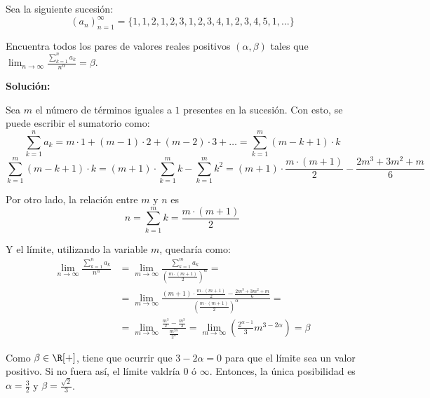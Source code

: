 \documentclass[../../main.tex]{subfiles}
\begin{document}
  \begin{shaded}
    Sea la siguiente sucesión:
    $$
    (a_n)_{n = 1}^\infty = \{1, 1, 2, 1, 2, 3, 1, 2, 3, 4, 1, 2, 3, 4, 5, 1, ...\}
    $$

    Encuentra todos los pares de valores reales positivos $(\alpha, \beta)$ tales que $ \displaystyle\lim_{n \to \infty} \displaystyle\frac{\displaystyle\sum_{k = 1}^n a_k}{n^\alpha} = \beta$.
  \end{shaded}

  \textbf{Solución:}

  Sea $m$ el número de términos iguales a $1$ presentes en la sucesión. Con esto, se puede escribir el sumatorio como:
  $$
  \sum_{k = 1}^n a_k = 
  m \cdot 1 + (m - 1) \cdot 2 + (m - 2) \cdot 3 + \dots = 
  \sum_{k = 1}^m (m - k + 1) \cdot k
  $$
  $$
  \sum_{k = 1}^m (m - k + 1) \cdot k = 
  (m + 1) \cdot \sum_{k = 1}^m k - \sum_{k = 1}^m k^2 = 
  (m + 1) \cdot \frac{m \cdot (m + 1)}{2} - \frac{2m^3 + 3m^2 + m}{6}
  $$

  Por otro lado, la relación entre $m$ y $n$ es
  $$
  n = \sum_{k = 1}^m k = \frac{m \cdot (m + 1)}{2}
  $$

  Y el límite, utilizando la variable $m$, quedaría como:
  \begin{equation*}
    \begin{split}
      \lim_{n \to \infty} \frac{\displaystyle\sum_{k = 1}^n a_k}{n^\alpha} & =
      \lim_{m \to \infty} \frac{\displaystyle\sum_{k = 1}^m a_k}{\left(\frac{m \cdot (m + 1)}{2}\right)^\alpha} = \\ & =
      \lim_{m \to \infty} \frac{(m + 1) \cdot \frac{m \cdot (m + 1)}{2} - \frac{2m^3 + 3m^2 + m}{6}}{\left(\frac{m \cdot (m + 1)}{2}\right)^\alpha} = \\ & =
      \lim_{m \to \infty} \frac{\frac{m^3}{2} - \frac{m^3}{3}}{\frac{m^{2\alpha}}{2^\alpha}} =
      \lim_{m \to \infty} \left(\frac{2^{\alpha - 1}}{3} m^{3 - 2\alpha}\right) = \beta
    \end{split}
  \end{equation*}

  Como $\beta \in \R[+]$, tiene que ocurrir que $3 - 2\alpha = 0$ para que el límite sea un valor positivo. Si no fuera así, el límite valdría $0$ ó $\infty$. Entonces, la única posibilidad es $\alpha = \displaystyle\frac{3}{2}$ y $\beta = \displaystyle\frac{\sqrt{2}}{3}$.
\end{document}
